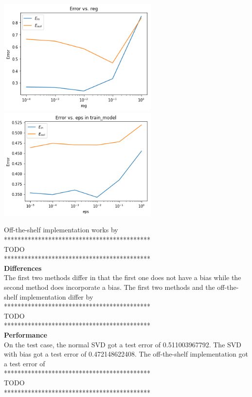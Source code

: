 \begin{center}
	\includegraphics[width=8cm]{Pictures/2_reg}\includegraphics[width=8cm]{Pictures/2_eps}
\end{center}
Off-the-shelf implementation works by \\
*******************************************\\
TODO \\
*******************************************\\

\noindent\textbf{Differences }\\
The first two methods differ in that the first one does not have a bias while the second method does incorporate a bias. The first two methods and the off-the-shelf implementation differ by \\
*******************************************\\
TODO \\
*******************************************\\

\noindent\textbf{Performance }\\
On the test case, the normal SVD got a test error of 0.511003967792. The SVD with bias got a test error of 0.472148622408. The off-the-shelf implementation got a test error of \\
*******************************************\\
TODO \\
*******************************************\\

